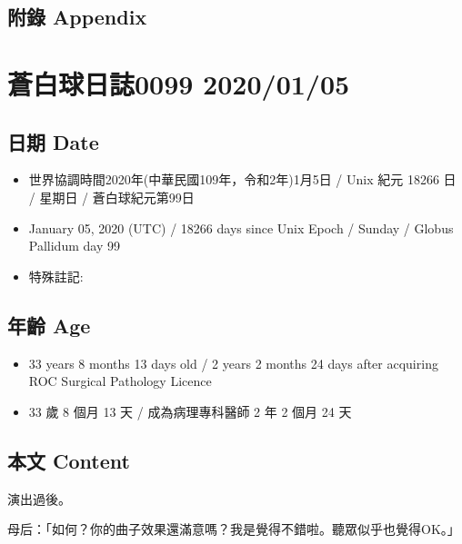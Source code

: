 \documentclass[
]{article}
\providecommand{\tightlist}{%
  \setlength{\itemsep}{0pt}\setlength{\parskip}{0pt}}
\begin{document}
\hypertarget{ux9644ux9304-appendix-3}{%
\subsection{附錄 Appendix}\label{ux9644ux9304-appendix-3}}

\hypertarget{ux84bcux767dux7403ux65e5ux8a8c0099-20200105}{%
\section{蒼白球日誌0099
2020/01/05}\label{ux84bcux767dux7403ux65e5ux8a8c0099-20200105}}

\hypertarget{ux65e5ux671f-date-4}{%
\subsection{日期 Date}\label{ux65e5ux671f-date-4}}

\begin{itemize}
\tightlist
\item
  世界協調時間2020年(中華民國109年，令和2年)1月5日 / Unix 紀元 18266 日
  / 星期日 / 蒼白球紀元第99日
\item
  January 05, 2020 (UTC) / 18266 days since Unix Epoch / Sunday / Globus
  Pallidum day 99
\item
  特殊註記:
\end{itemize}

\hypertarget{ux5e74ux9f61-age-4}{%
\subsection{年齡 Age}\label{ux5e74ux9f61-age-4}}

\begin{itemize}
\tightlist
\item
  33 years 8 months 13 days old / 2 years 2 months 24 days after
  acquiring ROC Surgical Pathology Licence
\item
  33 歲 8 個月 13 天 / 成為病理專科醫師 2 年 2 個月 24 天
\end{itemize}

\hypertarget{ux672cux6587-content-4}{%
\subsection{本文 Content}\label{ux672cux6587-content-4}}

演出過後。

母后：「如何？你的曲子效果還滿意嗎？我是覺得不錯啦。聽眾似乎也覺得OK。」
\end{document}
